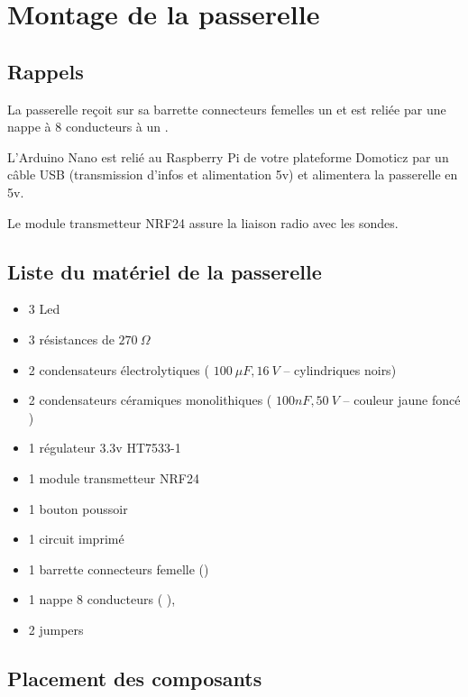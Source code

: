 \chapter{Montage de la passerelle}

\section{Rappels}

La passerelle reçoit sur sa barrette connecteurs femelles un  et est reliée par une nappe à 8 conducteurs à un .

L'Arduino Nano est relié au Raspberry Pi de votre plateforme Domoticz par un câble USB (transmission d'infos et alimentation 5v) et alimentera la passerelle en 5v.

Le module transmetteur NRF24 assure la liaison radio avec les sondes. 

\section{Liste du matériel de la passerelle}

\begin{itemize}
    \item 3 Led
    \item 3 résistances de $270~\Omega$
    \item 2 condensateurs électrolytiques ( $100~\mu F, 16~V$ – cylindriques noirs)
    \item 2 condensateurs céramiques monolithiques ( $100nF, 50~V$ – couleur jaune foncé )
    \item 1 régulateur 3.3v HT7533-1
    \item 1 module transmetteur NRF24
    \item 1 bouton poussoir
    \item 1 circuit imprimé
    \item 1 barrette connecteurs femelle ({\color{red}{déjà montée sur le circuit imprimé}})
    \item 1 nappe 8 conducteurs ({\color{red}{dont l'un porte un liseré rouge}} ),
    \item 2 jumpers
\end{itemize}

\section{Placement des composants}

